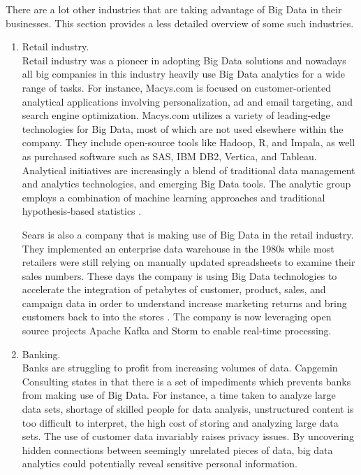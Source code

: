 \documentclass[runningheads]{llncs}
\begin{document}
There are a lot other industries that are taking advantage of Big Data in their businesses. This section provides a less detailed overview of some such industries.

\begin{enumerate}
\item Retail industry.\\

Retail industry was a pioneer in adopting Big Data solutions and nowadays all big companies in this industry heavily use Big Data analytics for a wide range of tasks. For instance, Macys.com is focused on customer-oriented analytical applications involving personalization, ad and email targeting, and search engine optimization. Macys.com utilizes a variety of leading-edge technologies for Big Data, most of which are not used elsewhere within the company. They include open-source tools like Hadoop, R, and Impala, as well as purchased software such as SAS, IBM DB2, Vertica, and Tableau. Analytical initiatives are increasingly a blend of traditional data management and analytics technologies, and emerging Big Data tools. The analytic group employs a combination of machine learning approaches and traditional hypothesis-based statistics \cite{DAVENPORT}.

Sears is also a company that is making use of Big Data in the retail industry. They implemented an enterprise data warehouse in the 1980s while most retailers were still relying on manually updated spreadsheets to examine their sales numbers. These days the company is using Big Data technologies to accelerate the integration of petabytes of customer, product, sales, and campaign data in order to understand increase marketing returns and bring customers back to into the stores \cite{DAVENPORT}. The company is now leveraging open source projects Apache Kafka and Storm to enable real-time processing.\\

\item Banking.\\

Banks are struggling to profit from increasing volumes of data. Capgemin Consulting states in \cite{} that there is a set of impediments which prevents banks from making use of Big Data. For instance, a time taken to analyze large data sets, shortage of skilled people for data analysis, unstructured content is too difficult to interpret, the high cost of storing and analyzing large data sets.  The use of customer data invariably raises privacy issues. By uncovering
hidden connections between seemingly unrelated pieces of data, big data analytics could potentially reveal sensitive
personal information\cite{CAP}. 


\end{enumerate}
\end{document}
